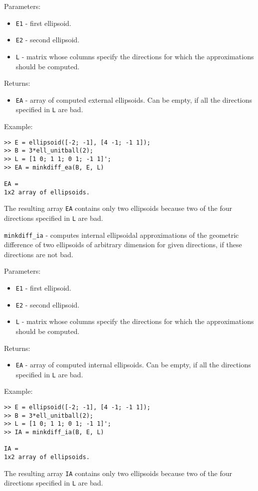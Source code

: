Parameters:
\begin{itemize}
\item {\tt E1} - first ellipsoid.
\item {\tt E2} - second ellipsoid.
\item {\tt L} - matrix whose columns specify the directions for which
the approximations should be computed.
\end{itemize}

Returns:
\begin{itemize}
\item {\tt EA} - array of computed external ellipsoids. Can be empty, if
all the directions specified in {\tt L} are bad.
\end{itemize}

Example:
{\tt \begin{verbatim}
>> E = ellipsoid([-2; -1], [4 -1; -1 1]);
>> B = 3*ell_unitball(2);
>> L = [1 0; 1 1; 0 1; -1 1]';
>> EA = minkdiff_ea(B, E, L)

EA =
1x2 array of ellipsoids.
\end{verbatim} }
The resulting array {\tt EA} contains only two ellipsoids because two
of the four directions specified in {\tt L} are bad.

\newpage

{\Large {\tt minkdiff\_ia}} - computes internal ellipsoidal approximations
of the geometric difference of two ellipsoids of arbitrary dimension
for given directions, if these directions are not bad.

Parameters:
\begin{itemize}
\item {\tt E1} - first ellipsoid.
\item {\tt E2} - second ellipsoid.
\item {\tt L} - matrix whose columns specify the directions for which
the approximations should be computed.
\end{itemize}

Returns:
\begin{itemize}
\item {\tt EA} - array of computed internal ellipsoids. Can be empty, if
all the directions specified in {\tt L} are bad.
\end{itemize}

Example:
{\tt \begin{verbatim}
>> E = ellipsoid([-2; -1], [4 -1; -1 1]);
>> B = 3*ell_unitball(2);
>> L = [1 0; 1 1; 0 1; -1 1]';
>> IA = minkdiff_ia(B, E, L)

IA =
1x2 array of ellipsoids.
\end{verbatim} }
The resulting array {\tt IA} contains only two ellipsoids because two
of the four directions specified in {\tt L} are bad.

